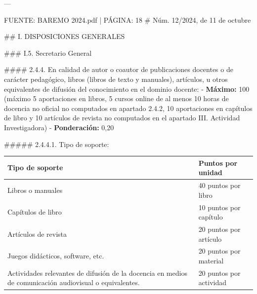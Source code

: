 \documentclass{article}
\begin{document}
\begin{itemize}
\begin{itemize}
\begin{scriptsize}
                  ---

                  FUENTE: BAREMO 2024.pdf | PÁGINA: 18
                  \# Núm. 12/2024, de 11 de octubre

                  \#\# I. DISPOSICIONES GENERALES

                  \#\#\# I.5. Secretario General

                  \#\#\#\# 2.4.4. En calidad de autor o coautor de publicaciones docentes o de carácter pedagógico, libros (libros de texto y manuales), artículos, u otros equivalentes de difusión del conocimiento en el dominio docente:
                  - \textbf{Máximo:} 100 (máximo 5 aportaciones en libros, 5 cursos online de al menos 10 horas de docencia no oficial no computados en apartado 2.4.2, 10 aportaciones en capítulos de libro y 10 artículos de revista no computados en el apartado III. Actividad Investigadora)
                  - \textbf{Ponderación:} 0,20

                  \#\#\#\#\# 2.4.4.1. Tipo de soporte:
                  \vspace{0.4cm}
                  \begin{table}[h!]\centering\renewcommand{\arraystretch}{1.3}
                    \begin{tabular}{|p{}|p{}|}\hline
                      Tipo de soporte                                                                                         & Puntos por unidad       \\\hline
                      Libros o manuales                                                                                       & 40 puntos por libro     \\\hline
                      Capítulos de libro                                                                                      & 10 puntos por capítulo  \\\hline
                      Artículos de revista                                                                                    & 20 puntos por artículo  \\\hline
                      Juegos didácticos, software, etc.                                                                       & 20 puntos por material  \\\hline
                      Actividades relevantes de difusión de la docencia en medios de comunicación audiovisual o equivalentes. & 20 puntos por actividad \\\hline
                    \end{tabular}\end{table}
                  \vspace{0.4cm}


\end{scriptsize}
\end{itemize}
\end{itemize}
\end{document}
